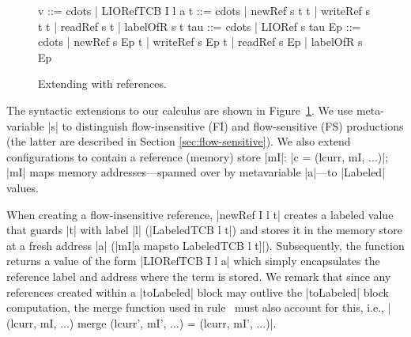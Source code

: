 \begin{figure}[t]
\small
\begin{code}
v    ::= cdots  | LIORefTCB I l a
t    ::= cdots  | newRef s t t | writeRef s t t | readRef s t
                | labelOfR s t
tau  ::= cdots  | LIORef s tau
Ep   ::= cdots  | newRef s Ep t | writeRef s Ep t | readRef s Ep 
                | labelOfR s Ep
\end{code}

\caption{Extending \lio{} with references.
\label{fig:sos:refs}}
\end{figure}
%
The syntactic extensions to our calculus are shown in Figure~\ref{fig:sos:refs}.
%
We use meta-variable |s| to distinguish flow-insensitive (\textrm{FI})
and flow-sensitive (\textrm{FS}) productions (the latter are described
in Section \ref{sec:flow-sensitive}).
%
%
We also extend configurations to contain a reference (memory)
store |mI|: |c = (lcurr, mI, ...)|;
%
|mI| maps memory addresses---spanned over by metavariable |a|---to |Labeled| values.
%
%

%
When creating a flow-insensitive reference, |newRef I l t| creates a labeled
value that guards |t| with label |l| (|LabeledTCB l t|) and stores it in the
memory store at a fresh address |a| (|mI[a mapsto LabeledTCB l t]|).
%
Subsequently, the function returns a value of the form |LIORefTCB I l
a| which simply encapsulates the reference label and address where the
term is stored.
%
We remark that since any references created within a |toLabeled|
block may outlive the |toLabeled| block computation, 
%
the merge function used in rule~ must also account
for this, i.e.,
|(lcurr, mI, ...) merge (lcurr', mI', ...) = (lcurr, mI', ...)|.
%
 
